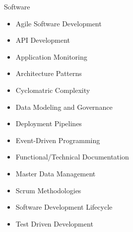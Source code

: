 \begin{multicols*}{3}
\vspace*{-0.3 in}
\Competencies
{Software}
{\begin{itemize}
    \item Agile Software Development
    \item API Development
    \item Application Monitoring
    \item Architecture Patterns
    \item Cyclomatric Complexity
    \item Data Modeling and Governance
    \item Deployment Pipelines
    \item Event-Driven Programming
    \item Functional/Technical Documentation
    \item Master Data Management
    \item Scrum Methodologies
    \item Software Development Lifecycle
    \item Test Driven Development
\end{itemize}}
\end{multicols*}
